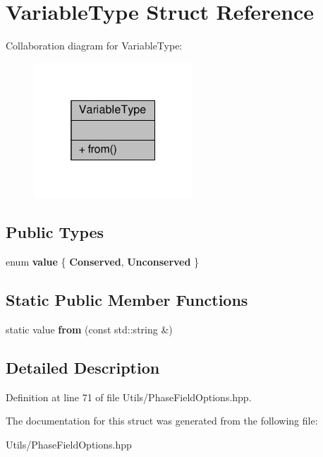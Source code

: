 \hypertarget{structVariableType}{}\section{Variable\+Type Struct Reference}
\label{structVariableType}


Collaboration diagram for Variable\+Type\+:\nopagebreak
\begin{figure}[H]
\begin{center}
\leavevmode
\includegraphics[width=169pt]{structVariableType__coll__graph}
\end{center}
\end{figure}
\subsection*{Public Types}
\begin{DoxyCompactItemize}
\item 
\mbox{\label{structVariableType_a8aacea6d6178d9f4d6eb8b7433344846}} 
enum {\bfseries value} \{ {\bfseries Conserved}, 
{\bfseries Unconserved}
 \}
\end{DoxyCompactItemize}
\subsection*{Static Public Member Functions}
\begin{DoxyCompactItemize}
\item 
\mbox{\label{structVariableType_a2061557933c6cfc9f76d42f4b2e24ba1}} 
static value {\bfseries from} (const std\+::string \&)
\end{DoxyCompactItemize}


\subsection{Detailed Description}


Definition at line 71 of file Utils/\+Phase\+Field\+Options.\+hpp.



The documentation for this struct was generated from the following file\+:\begin{DoxyCompactItemize}
\item 
Utils/\+Phase\+Field\+Options.\+hpp\end{DoxyCompactItemize}
